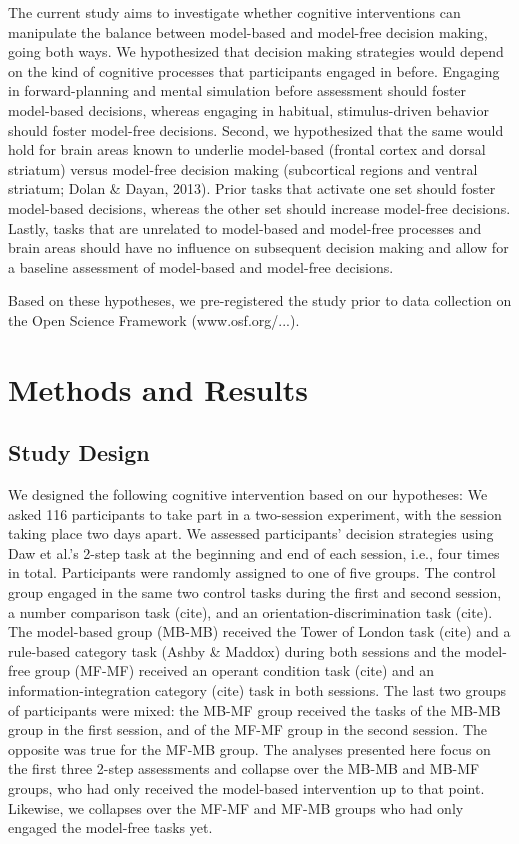 \documentclass[11pt]{article} %
\begin{document}
The current study aims to investigate whether cognitive interventions can manipulate the balance between model-based and model-free decision making, going both ways. We hypothesized that decision making strategies would depend on the kind of cognitive processes that participants engaged in before. Engaging in forward-planning and mental simulation before assessment should foster model-based decisions, whereas engaging in habitual, stimulus-driven behavior should foster model-free decisions. Second, we hypothesized that the same would hold for brain areas known to underlie model-based (frontal cortex and dorsal striatum) versus model-free decision making (subcortical regions and ventral striatum; Dolan \& Dayan, 2013). Prior tasks that activate one set should foster model-based decisions, whereas the other set should increase model-free decisions. Lastly, tasks that are unrelated to model-based and model-free processes and brain areas should have no influence on subsequent decision making and allow for a baseline assessment of model-based and model-free decisions.

Based on these hypotheses, we pre-registered the study prior to data collection on the Open Science Framework (www.osf.org/...).

\section{Methods and Results}
\subsection{Study Design}

We designed the following cognitive intervention based on our hypotheses: We asked 116 participants to take part in a two-session experiment, with the session taking place two days apart. We assessed participants' decision strategies using Daw et al.'s 2-step task at the beginning and end of each session, i.e., four times in total. Participants were randomly assigned to one of five groups. The control group engaged in the same two control tasks during the first and second session, a number comparison task (cite), and an orientation-discrimination task (cite). The model-based group (MB-MB) received the Tower of London task (cite) and a rule-based category task (Ashby \& Maddox) during both sessions and the model-free group (MF-MF) received an operant condition task (cite) and an information-integration category (cite) task in both sessions. The last two groups of participants were mixed: the MB-MF group received the tasks of the MB-MB group in the first session, and of the MF-MF group in the second session. The opposite was true for the MF-MB group. The analyses presented here focus on the first three 2-step assessments and collapse over the MB-MB and MB-MF groups, who had only received the model-based intervention up to that point. Likewise, we collapses over the MF-MF and MF-MB groups who had only engaged the model-free tasks yet.
\end{document}
